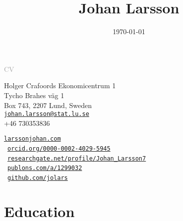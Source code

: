 \documentclass[
  10pt,
  headsepline=true,
  english,
  DIV=12
]{scrartcl}
\date{\today}
\title{Johan Larsson}
\renewcommand*{%
  \mkbibnamegiven
}[1]{\ifitemannotation{highlight}{\textbf{#1}}{#1}}
\renewcommand*{%
  \mkbibnamefamily
}[1]{\ifitemannotation{highlight}{\textbf{#1}}{#1}}
\begin{document}
\begin{titlepage}
\end{titlepage}

\begin{center}
  {\large \textcolor{darkgray}{CV}}
  \medskip

  \smallskip

  \noindent {\large \today}
\end{center}

\baselineskip

\begin{minipage}[t]{.5\textwidth}
  \small\noindent%
  Holger Crafoords Ekonomicentrum 1\\
  Tycho Brahes väg 1\\
  Box 743, 2207 Lund, Sweden
  \vspace{1ex}\\
  \href{mailto:johan.larsson@stat.lu.se}{\nolinkurl{johan.larsson@stat.lu.se}}\\
  +46 730353836
\end{minipage}%
\begin{minipage}[t]{0.5\textwidth}
  \raggedleft\small%
  \href{https://larssonjohan.com}{\nolinkurl{larssonjohan.com}}\\
  {\aiOrcid}\,
  \href{https://orcid.org/0000-0002-4029-5945}{\nolinkurl{orcid.org/0000-0002-4029-5945}}\\
  {\aiResearchGate}\,
  \href{https://www.researchgate.net/profile/Johan_Larsson7}{\nolinkurl{researchgate.net/profile/Johan\_Larsson7}}\\
  {\aiPublons}\,
  \href{https://publons.com/a/1299032}{\nolinkurl{publons.com/a/1299032}}\\
  {\faGithub}\, \href{https://github.com/jolars}{\nolinkurl{github.com/jolars}}
\end{minipage}


\section{Education}

\end{document}
